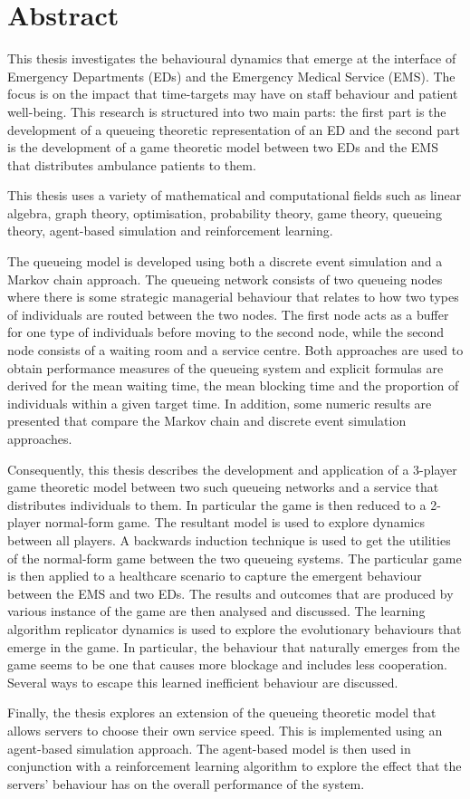 \chapter*{Abstract}

This thesis investigates the behavioural dynamics that emerge at the
interface of Emergency Departments (EDs) and the Emergency Medical Service
(EMS).
The focus is on the impact that time-targets may have on staff
behaviour and patient well-being.
This research is structured into two main parts: the first part is the
development of a queueing theoretic representation of an ED and the second
part is the development of a game theoretic model between two EDs and the
EMS that distributes ambulance patients to them.

This thesis uses a variety of mathematical and computational fields such as
linear algebra, graph theory, optimisation, probability theory, game
theory, queueing theory, agent-based simulation and reinforcement learning.

The queueing model is developed using both a discrete event simulation
and a Markov chain approach.
The queueing network consists of two queueing nodes where there is some
strategic managerial behaviour that relates to how two types of individuals
are routed between the two nodes.
The first node acts as a buffer for one type of individuals before moving 
to the second node, while the second node consists of a waiting room and a
service centre.
Both approaches are used to obtain performance measures of the queueing
system and explicit formulas are derived for the mean waiting time, the
mean blocking time and the proportion of individuals within a given target
time.
In addition, some numeric results are presented that compare the
Markov chain and discrete event simulation approaches.

Consequently, this thesis describes the development and application of a
3-player game  theoretic model between two such queueing networks and a
service that distributes individuals to them.
In particular the game is then reduced to a 2-player normal-form game.
The resultant model is used to explore dynamics between all players.
A backwards induction technique is used to get the utilities of the
normal-form game between the two queueing systems.
The particular game is then applied to a healthcare scenario to capture the
emergent behaviour between the EMS and two EDs.
The results and outcomes that are produced by various instance of the game
are then analysed and discussed.
The learning algorithm replicator dynamics is used to explore the
evolutionary behaviours that emerge in the game.
In particular, the behaviour that naturally emerges from the game seems to
be one that causes more blockage and includes less cooperation.
Several ways to escape this learned inefficient behaviour are discussed.

Finally, the thesis explores an extension of the queueing theoretic model
that allows servers to choose their own service speed.
This is implemented using an agent-based simulation approach.
The agent-based model is then used in conjunction with a reinforcement
learning algorithm to explore the effect that the servers' behaviour has 
on the overall performance of the system.

